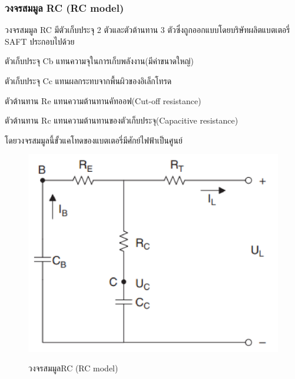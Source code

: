 \subsubsection*{วงจรสมมูล RC (RC model)}
วงจรสมมูล RC มีตัวเก็บประจุ 2 ตัวและตัวต้านทาน 3 ตัวซึ่งถูกออกแบบโดยบริษัทผลิตแบตเตอรี่ SAFT ประกอบไปด้วย
\begin{itemize}
	{\item 	ตัวเก็บประจุ Cb แทนความจุในการเก็บพลังงาน(มีค่าขนาดใหญ่)}
	{\item 	ตัวเก็บประจุ Cc แทนผลกระทบจากพื้นผิวของอิเล็กโทรด}
	{\item 	ตัวต้านทาน Re แทนความต้านทานคัทออฟ(Cut-off resistance)}
	{\item 	ตัวต้านทาน Rc แทนความต้านทานของตัวเก็บประจุ(Capacitive resistance)}
\end{itemize}
โดยวงจรสมมูลนี้ขั้วแคโทดของแบตเตอรี่มีศักย์ไฟฟ้าเป็นศูนย์
\begin{center}
	\begin{figure}[H]
		\includegraphics[width=0.6\linewidth]{Chapters/img/RC_model.png}
			\centering
			\captionsetup{justification=centering,margin=2cm}
			\caption{วงจรสมมูลRC (RC model)}
			\cite{jiangzhang2015}
	\end{figure}
\end{center}
